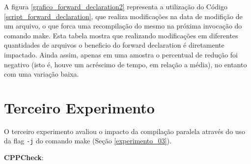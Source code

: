A figura \ref{grafico_forward_declaration2} representa a utilização
 do Código \ref{script_forward_declaration},
 que realiza modificações na data de modifição de um arquivo, o que forca uma
 recompilação do mesmo na próxima invocação do comando make.
 Esta tabela mostra que realizando modificações em diferentes
 quantidades de arquivos o beneficio do forward declaration é
 diretamente impactado. Ainda assim, apenas em uma amostra o percentual
 de redução foi negativo  (isto é, houve um acréscimo de tempo,
 em relação a média), no entanto com uma variação baixa.



\section{Terceiro Experimento}

O terceiro experimento avaliou o impacto da compilação
 paralela através do uso da flag \texttt{-j} do
 comando make (Seção \ref{experimento_03}).



\textbf{CPPCheck}:


